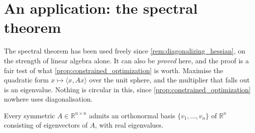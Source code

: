 
\section{An application: the spectral theorem}
\label{sec:spectral_theorem_optimization}

The spectral theorem has been used freely since \cref{rem:diagonalizing_hessian}, on the strength
of linear algebra alone. It can also be \emph{proved} here, and the proof is a fair test of what
\cref{prop:constrained_optimization} is worth. Maximise the quadratic form
$x \mapsto \langle x, Ax\rangle$ over the unit sphere, and the multiplier that falls out is an
eigenvalue. Nothing is circular in this, since \cref{prop:constrained_optimization} nowhere uses
diagonalisation.

\begin{theorem}
\label{thm:spectral_theorem_optimization}
Every symmetric $A \in \mathbb{R}^{n\times n}$ admits an orthonormal basis
$\{v_1,\dots,v_n\}$ of $\mathbb{R}^n$ consisting of eigenvectors of $A$, with real eigenvalues.
\end{theorem}

